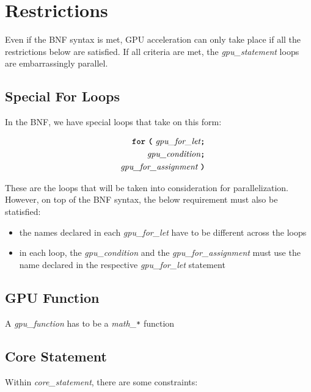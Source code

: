 \newpage

\section*{Restrictions}

Even if the BNF syntax is met, GPU acceleration can only take place if all the restrictions below are satisfied. If all criteria are met, the \textit{gpu\_statement} loops are embarrassingly parallel.

\subsection*{Special For Loops}

In the BNF, we have special loops that take on this form:

\begin{alignat*}{9}
&& \textbf{\texttt{for}}\ \textbf{\texttt{(}} 
                          \ \textit{gpu\_for\_let} \textbf{\texttt{;}} \\
&& \ \ \textit{gpu\_condition} \textbf{\texttt{;}} \\
&& \textit{gpu\_for\_assignment} \ \textbf{\texttt{)}} 
\end{alignat*}

These are the loops that will be taken into consideration for parallelization. However, on top of the BNF syntax, the below requirement must also be statisfied:

\begin{itemize}
    \item{the names declared in each \textit{gpu\_for\_let} have to be different across the loops}
    \item{in each loop, the \textit{gpu\_condition} and the \textit{gpu\_for\_assignment} must use the name declared
    in the respective \textit{gpu\_for\_let} statement}
\end{itemize}

\subsection*{GPU Function}

A \textit{gpu\_function} has to be a \textit{math\_\texttt{*}} function

\subsection*{Core Statement}

Within \textit{core\_statement}, there are some constraints:


